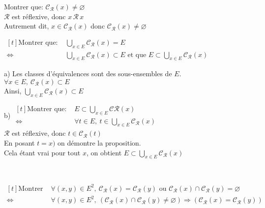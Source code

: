 \documentclass[12pt,twoside,a4paper]{article}
\begin{document}
		\begin{preuve}
			\begin{liste}
				\item[\cercle{1}] Montrer que: $\mathcal{C_R}(x)\neq\varnothing$\\
					$\mathcal{R}$ est r\'eflexive, donc $x\,\mathcal{R}\,x$\\
					Autrement dit, $x\in \mathcal{C_R}(x)$ donc $\mathcal{C_R}(x)\neq\varnothing$\\
				\item[\cercle{2}] $\begin{aligned}[t]\text{Montrer que: }&\bigcup\limits_{x\in E}\mathcal{C_R}(x)=E\\
					\iff&\bigcup\limits_{x\in E}\mathcal{C_R}(x)\subset E\text{ et que }E\subset\bigcup\limits_{x\in E}\mathcal{C_R}(x)\end{aligned}$
					\begin{liste}
						\item[a)] Les classes d'\'equivalences sont des sous-ensembles de $E$.\\
							$\forall x\in E,\ \mathcal{C_R}(x)\subset E$\\
							Ainsi, $\bigcup\limits_{x\in E}\mathcal{C_R}(x)\subset E$
						\item[b)] $\begin{aligned}[t]\text{Montrer que: }&E\subset\bigcup\limits_{x\in E}\mathcal{C}\mathcal{R}(x)\\
							\iff&\forall t\in E,\ t\in\bigcup\limits_{x\in E}\mathcal{C_R}(x)\end{aligned}$\\
							$\mathcal{R}$ est r\'eflexive, donc $t\in \mathcal{C_R}(t)$\\
							En posant $t=x)$ on d\'emontre la proposition.\\
							Cela \'etant vrai pour tout $x$, on obtient $E\subset\bigcup\limits_{x\in E}\mathcal{C_R}(x)$
					\end{liste}\ \\
				\item[\cercle{3}]$\begin{aligned}[t]\text{Montrer que: }&\forall(x,y)\in E^2,\ \mathcal{C_R}(x)=\mathcal{C_R}(y)\text{ ou } \mathcal{C_R}(x)\cap \mathcal{C_R}(y)=\varnothing\\
					\iff&\forall(x,y)\in E^2,\ \left(\mathcal{C_R}(x)\cap \mathcal{C_R}(y)\neq\varnothing\right)\Rightarrow \left(\mathcal{C_R}(x)=\mathcal{C_R}(y)\right)\end{aligned}$\\

\end{liste}
\end{preuve}
\end{document}
